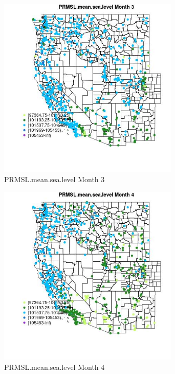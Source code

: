\begin{figure} 
\centering  
\includegraphics[width=0.77\textwidth]{Code_Outputs/Report_ML_input_PM25_Step4_part_f_de_duplicated_aves_prioritize_24hr_obswNAs_MapObsMo3PRMSLmeansealevel.jpg} 
\caption{\label{fig:Report_ML_input_PM25_Step4_part_f_de_duplicated_aves_prioritize_24hr_obswNAsMapObsMo3PRMSLmeansealevel}PRMSL.mean.sea.level Month 3} 
\end{figure} 
 

\begin{figure} 
\centering  
\includegraphics[width=0.77\textwidth]{Code_Outputs/Report_ML_input_PM25_Step4_part_f_de_duplicated_aves_prioritize_24hr_obswNAs_MapObsMo4PRMSLmeansealevel.jpg} 
\caption{\label{fig:Report_ML_input_PM25_Step4_part_f_de_duplicated_aves_prioritize_24hr_obswNAsMapObsMo4PRMSLmeansealevel}PRMSL.mean.sea.level Month 4} 
\end{figure} 
 


